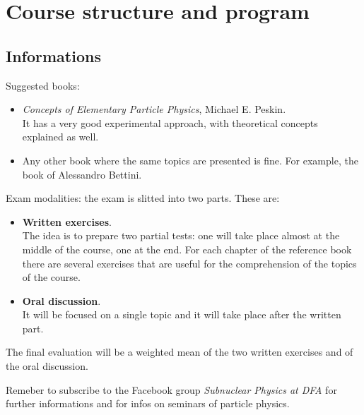 \documentclass[../../main/main.tex]{subfiles}
\begin{document}
\chapter*{Course structure and program}


\section*{Informations}
Suggested books:
\begin{itemize}
    \item \emph{Concepts of Elementary Particle Physics}, Michael E. Peskin.\\
        It has a very good experimental approach, with theoretical concepts explained as well.
    \item Any other book where the same topics are presented is fine. For example, the book of Alessandro Bettini.
\end{itemize}

Exam modalities: the exam is slitted into two parts. These are:
\begin{itemize}
    \item \textbf{Written exercises}.\\
        The idea is to prepare two partial tests: one will take place almost at the middle of the course, one at the end. For each chapter of the reference book there are several exercises that are useful for the comprehension of the topics of the course.
    \item \textbf{Oral discussion}.\\
        It will be focused on a single topic and it will take place after the written part.
\end{itemize}
The final evaluation will be a weighted mean of the two written exercises and of the oral discussion.

Remeber to subscribe to the Facebook group \emph{Subnuclear Physics at DFA} for further informations and for infos on seminars of particle physics.
\end{document}
